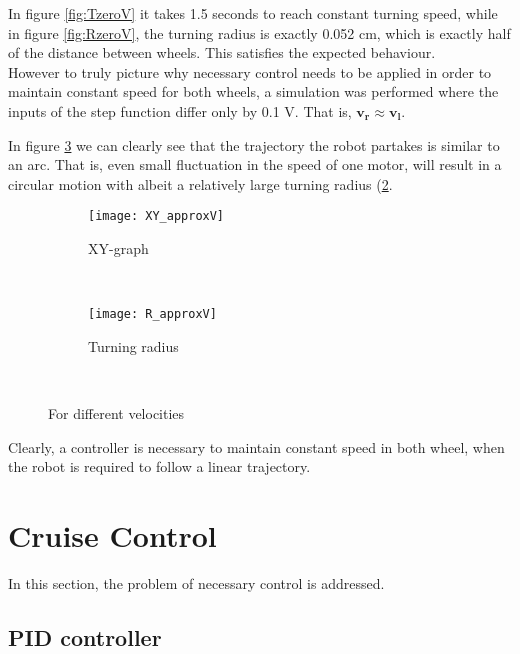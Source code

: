 {In figure \ref{fig:TzeroV} it takes 1.5 seconds to reach constant turning speed, while in figure \ref{fig:RzeroV}, the turning radius is exactly 0.052 cm, which is exactly half of the distance between wheels. This satisfies the expected behaviour. \\


However to truly picture why necessary control needs to be applied in order to maintain constant speed for both wheels, a simulation was performed where the inputs of the step function differ only by 0.1 V. That is, $\boldsymbol{v_r \approx v_l}$. 

In figure \ref{fig:approxV} we can clearly see that the trajectory the robot partakes is similar to an arc. That is, even small fluctuation in the speed of one motor, will result in a circular motion with albeit a relatively large turning radius (\ref{fig:RapproxV}. 

\newpage

\begin{figure}[h]
    \centering
    \begin{subfigure}[h]{0.47\textwidth}
        \texttt{[image: XY\_approxV]}
        \caption{XY-graph}
        \label{fig:approxV}
    \end{subfigure}
    ~ %
    \begin{subfigure}[h]{0.47\textwidth}
        \texttt{[image: R\_approxV]}
        \caption{Turning radius}
        \label{fig:RapproxV}
    \end{subfigure}
    ~ %
    \caption{For different velocities}\label{fig:approxV}
\end{figure}

Clearly, a controller is necessary to maintain constant speed in both wheel, when the robot is required to follow a linear trajectory.

\section{Cruise Control}

In this section, the problem of necessary control is addressed. 

\subsection{PID controller}

}
